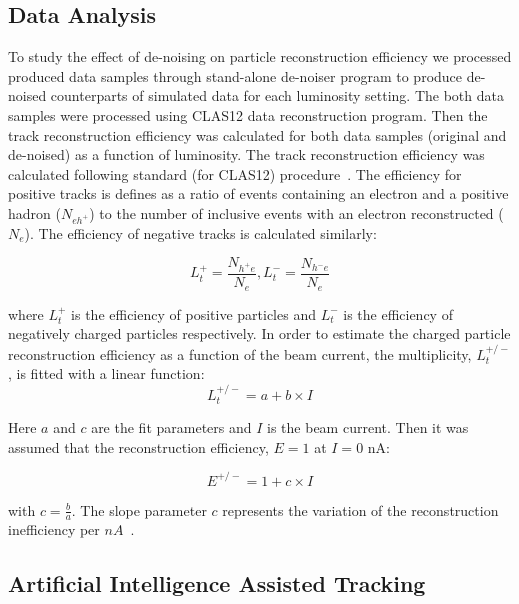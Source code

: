\subsection{Data Analysis}

To study the effect of de-noising on particle reconstruction efficiency we processed produced data samples through stand-alone de-noiser program to produce de-noised counterparts of simulated data for each luminosity setting. The both data samples were processed using CLAS12 data reconstruction program. Then the track reconstruction efficiency was calculated for both data samples (original and de-noised) as a function of luminosity. The track reconstruction efficiency was calculated following standard (for CLAS12) procedure~\cite{Stepanyan:2020bg}. The efficiency for positive  tracks is defines as a ratio of 
events containing an electron and a positive  hadron ($N_{eh^+}$) to the number of inclusive events with an electron reconstructed ($N_{e}$). The efficiency of negative tracks is calculated similarly:

\begin{equation}
L_t^+ = \frac{N_{h^+e}}{N_e} , L_t^- = \frac{N_{h^-e}}{N_e} 
\label{eq::eff}
\end{equation}

where $L_t^+$ is the efficiency of positive particles and $L_t^-$ is the efficiency of negatively
charged particles respectively. In order to estimate the charged particle reconstruction efficiency
as a function of the beam current, the multiplicity, $L_t^{+/-}$, is fitted with a linear function:
\begin{equation}
L_t^{+/-} = a + b\times I
\end{equation}

Here $a$ and $c$ are the fit parameters and $I$ is the beam current. Then it was assumed that the
reconstruction efficiency, $E=1$ at $I=0$ nA:

\begin{equation}
E^{+/-} = 1 + c \times I
\end{equation}

with $c=\frac{b}{a}$. The slope parameter $c$ represents the variation of the reconstruction
inefficiency per $nA$~\cite{Stepanyan:2020bg}.

\subsection{Artificial Intelligence Assisted Tracking}

